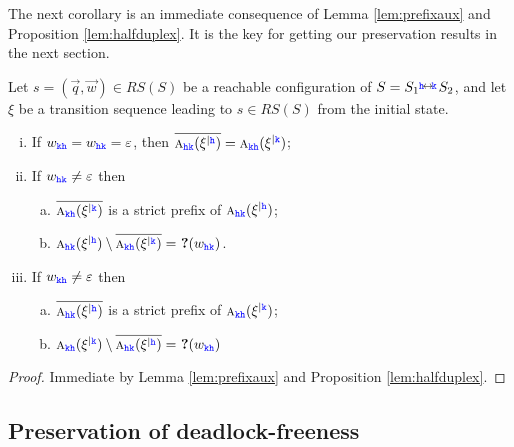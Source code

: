 The next corollary is an immediate consequence of Lemma \ref{lem:prefixaux}  and Proposition \ref{lem:halfduplex}. It is the key for getting our preservation results in the next section.

\begin{corollary}%
\label{lem:prefix}
Let $s= (\vec{q},\vec{w}) \in RS(S)$ be a reachable configuration of
$S={S_{1}}\connect{\HH}{\KK} {S_{2}}$, and
let $\xi$ be a transition sequence leading to $s\in RS(S)$ from the initial state.
\begin{enumerate}[i)]
\item
\label{lem:prefixcor-iii}
If $w_{\KK\HH}= w_{\HH\KK}=\varepsilon$, then
 $\Dual{\symb{\HH\KK}{\restrictup{\xi}{\HH}}}=\symb{\KK\HH}{\restrictup{\xi}{\KK}}$;

\item
\label{lem:prefixcor-i}

If $w_{\HH\KK}\neq\varepsilon$  then 
\begin{enumerate}[a)]
\item 
$\Dual{\symb{\KK\HH}{\restrictup{\xi}{\KK}}}$
 is a strict prefix of
$\symb{\HH\KK}{\restrictup{\xi}{\HH}}$;
\item
$\symb{\HH\KK}{\restrictup{\xi}{\HH}}\setminus \Dual{\symb{\KK\HH}{\restrictup{\xi}{\KK}}} = \qm({{w}_{\HH\KK}})$.
\end{enumerate}

\item
\label{lem:prefixcor-ii}

If $w_{\KK\HH}\neq\varepsilon$ then 
\begin{enumerate}[a)]
\item 
$\Dual{\symb{\HH\KK}{\restrictup{\xi}{\HH}}}$
 is a strict prefix of
$\symb{\KK\HH}{\restrictup{\xi}{\KK}}$;

\item
$\symb{\KK\HH}{\restrictup{\xi}{\KK}}\setminus \Dual{\symb{\HH\KK}{\restrictup{\xi}{\HH}}}
 = \qm({{w}_{\KK\HH}})$
\end{enumerate}
\end{enumerate}
\end{corollary}
\begin{proof}
Immediate by Lemma \ref{lem:prefixaux} and Proposition \ref{lem:halfduplex}.
\end{proof}


\subsection{Preservation of deadlock-freeness}

